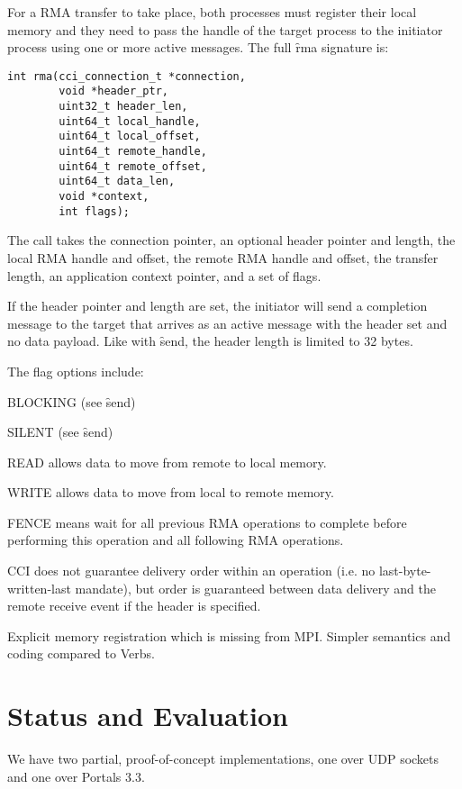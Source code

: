 \documentclass[conference]{IEEEtran}
\begin{document}
For a RMA transfer to take place, both processes must register their local memory and they
need to pass the handle of the target process to the initiator process using one or more
active messages. The full \f{rma} signature is:

\begin{verbatim}
int rma(cci_connection_t *connection,
        void *header_ptr,
        uint32_t header_len,
        uint64_t local_handle,
        uint64_t local_offset,
        uint64_t remote_handle,
        uint64_t remote_offset,
        uint64_t data_len,
        void *context,
        int flags);
\end{verbatim}

The call takes the connection pointer, an optional header pointer and length, the local
RMA handle and offset, the remote RMA handle and offset, the transfer length, an
application context pointer, and a set of flags.

If the header pointer and length are set, the initiator will send a completion message to
the target that arrives as an active message with the header set and no data payload. Like
with \f{send}, the header length is limited to 32 bytes.

The flag options include:

\begin{description}
\item BLOCKING (see \f{send})
\item SILENT (see \f{send})
\item READ allows data to move from remote to local memory.
\item WRITE allows data to move from local to remote memory.
\item FENCE means wait for all previous RMA operations to complete before performing this
operation and all following RMA operations.
\end{description}

CCI does not guarantee delivery order within an operation (i.e. no last-byte-written-last
mandate), but order is guaranteed between data delivery and the remote receive event if
the header is specified.

 Explicit memory registration which is missing from MPI. Simpler semantics and coding compared to Verbs.

\section{Status and Evaluation}
We have two partial, proof-of-concept implementations, one over UDP sockets and
one over Portals 3.3.
\end{document}
